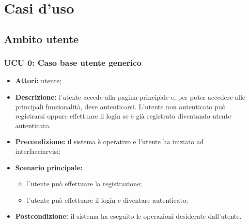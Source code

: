 \section{Casi d'uso}

\iffalse  %
\paragraph{UC 1:}
\begin{itemize}
\item \textbf{Attori:} utente autenticato;
\item \textbf{Descrizione:} 
\item \textbf{Precondizione:} 
\item \textbf{Scenario principale:} 
\begin{itemize}
\item 
\end{itemize}
\item \textbf{Postcondizione:}
\end{itemize}
\fi

\subsection{Ambito utente}

\subsubsection{UCU 0: Caso base utente generico}

\begin{itemize}
\item \textbf{Attori:} utente;
\item \textbf{Descrizione:} l'utente accede alla pagina principale e, per poter accedere alle principali funzionalità, deve autenticarsi.
L'utente non autenticato può registrarsi oppure effettuare il login se è già registrato diventando utente autenticato.
\item \textbf{Precondizione:} il sistema è operativo e l'utente ha iniziato ad interfacciarvisi;
\item \textbf{Scenario principale:}
\begin{itemize}
\item l'utente può effettuare la registrazione;
\item l'utente può effettuare il login e diventare autenticato;
\end{itemize}
\item \textbf{Postcondizione:} il sistema ha eseguito le operazioni desiderate dall'utente.
\end{itemize}

